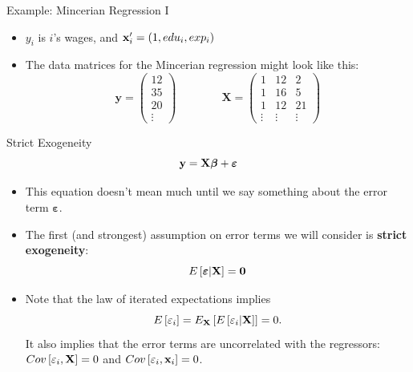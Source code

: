 \documentclass[english,xcolor={dvipsnames},aspectratio=169]{beamer}
\begin{document}
\begin{frame}{Example: Mincerian Regression I}
\begin{itemize}
	\item $y_{i}$ is $i$'s wages, and ${\bf x}_i' = \left(1,edu_i,exp_i \right)$

	\medskip
	\item The data matrices for the Mincerian regression might look like this:
\[
\boldsymbol{y}=\left(\begin{array}{c}
12\\
35\\
20\\
\vdots
\end{array}\right)\qquad\qquad\boldsymbol{X}=\left(\begin{array}{ccc}
1 & 12 & 2\\
1 & 16 & 5\\
1 & 12 & 21\\
\vdots & \vdots & \vdots
\end{array}\right)
\]
\end{itemize}
\end{frame}

\begin{frame}{Strict Exogeneity}
	\begin{equation*}
		{\bf y}= {\bf X} \boldsymbol{\beta} + \boldsymbol{\varepsilon}
	\end{equation*}
\begin{itemize}
	\item This equation doesn't mean much until we say something about the error term $\boldsymbol{\varepsilon}$.

	\item The first (and strongest) assumption on error terms we will consider is {\bf strict exogeneity}:\[
		E\left[\boldsymbol{\varepsilon} | {\bf X} \right] = {\bf 0}
	\]

	\item Note that the law of iterated expectations implies\[
		E\left[\varepsilon_i\right] = E_{{\bf X}} \left[E\left[\varepsilon_i | {\bf X}\right] \right] = 0.
	\]
	It also implies that the error terms are uncorrelated with the regressors: $Cov\left[\varepsilon_{i},{\bf X}\right]=0$ 
	and $Cov\left[\varepsilon_{i}, {\bf x}_{i}\right]=0$.
\end{itemize}
\end{frame}
\end{document}
